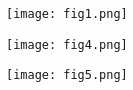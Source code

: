 \documentclass{beamer}
\begin{document}
\frame
{
\begin{figure}[htb]
\texttt{[image: fig1.png]}
\end{figure}
}

\frame
{
\begin{figure}[htb]
\texttt{[image: fig4.png]}
\end{figure}
}

\frame
{
\begin{figure}[htb]
\texttt{[image: fig5.png]}
\end{figure}
}
\end{document}
